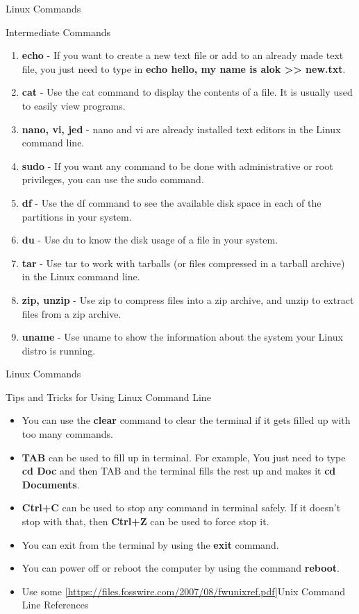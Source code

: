 \documentclass{if-beamer}
\begin{document}
\begin{frame}{Linux Commands}
\begin{alertblock}{Intermediate Commands}
\begin{enumerate}
    \item \textbf{echo} - If you want to create a new text file or add to an already made text file, you just need to type in \textbf{echo hello, my name is alok >> new.txt}.
    \item \textbf{cat} - Use the cat command to display the contents of a file. It is usually used to easily view programs.
    \item \textbf{nano, vi, jed} - nano and vi are already installed text editors in the Linux command line. 
    \item \textbf{sudo} - If you want any command to be done with administrative or root privileges, you can use the sudo command.
    \item \textbf{df} - Use the df command to see the available disk space in each of the partitions in your system. 
    \item \textbf{du} - Use du to know the disk usage of a file in your system. 
    \item \textbf{tar} - Use tar to work with tarballs (or files compressed in a tarball archive) in the Linux command line.
    \item \textbf{zip, unzip} -  Use zip to compress files into a zip archive, and unzip to extract files from a zip archive.
    \item \textbf{uname} - Use uname to show the information about the system your Linux distro is running.
\end{enumerate}
\end{alertblock}
\end{frame}
\begin{frame}{Linux Commands}
\begin{large}
\centering
Tips and Tricks for Using Linux Command Line
\end{large}
\begin{itemize}
    \item You can use the \textbf{clear} command to clear the terminal if it gets filled up with too many commands.
    \item \textbf{TAB} can be used to fill up in terminal. For example, You just need to type \textbf{cd Doc} and then TAB and the terminal fills the rest up and makes it \textbf{cd Documents}.
    \item \textbf{Ctrl+C} can be used to stop any command in terminal safely. If it doesn't stop with that, then \textbf{Ctrl+Z} can be used to force stop it.
    \item You can exit from the terminal by using the \textbf{exit} command.
    \item You can power off or reboot the computer by using the command \textbf{reboot}.
    \item Use some \cref{https://files.fosswire.com/2007/08/fwunixref.pdf}{Unix Command Line References}
\end{itemize}
\end{frame}
\end{document}
